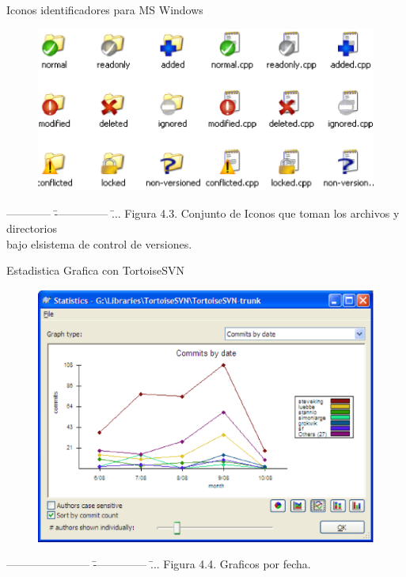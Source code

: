 \documentclass[xcolor=dvipsnames]{beamer}
\begin{document}
	\begin{frame}{Iconos identificadores para MS Windows}
	\scriptsize
	{
	\begin{figure}
	\centering 
		\includegraphics[scale=0.49]{svn_icons.eps}
	\end{figure}
	\begin{tabbing}
		------------ \= --------------- \= ... \kill
		\> Figura 4.3. Conjunto de Iconos que toman los archivos y directorios\\
		\>\>  bajo elsistema de control de versiones.\\
	\end{tabbing}
	}
	\end{frame}	

	\begin{frame}{Estadistica Grafica con TortoiseSVN}
	\scriptsize
	{
	\begin{figure}
	\centering 
		\includegraphics[scale=0.37]{svn_grafico.eps} 
	\end{figure}
	\begin{tabbing}
		----------------------- \= --------------- \= ... \kill
		\>\> Figura 4.4. Graficos por fecha.
	\end{tabbing}
	}
	\end{frame}	
\end{document}
